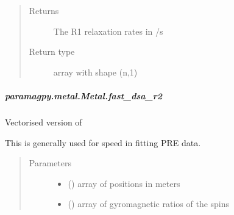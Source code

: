 \documentclass[a4paper,10pt,english]{sphinxmanual}
\begin{document}
\begin{fulllineitems}
\begin{fulllineitems}
\begin{fulllineitems}
\begin{quote}
\begin{description}
\begin{itemize}
\end{itemize}

\item[{Returns}] \leavevmode
{} \textendash{} The R1 relaxation rates in /s

\item[{Return type}] \leavevmode
array with shape (n,1)

\end{description}\end{quote}

\end{fulllineitems}



\subparagraph{paramagpy.metal.Metal.fast\_dsa\_r2}
\label{\detokenize{reference/generated/paramagpy.metal.Metal.fast_dsa_r2:paramagpy-metal-metal-fast-dsa-r2}}\label{\detokenize{reference/generated/paramagpy.metal.Metal.fast_dsa_r2::doc}}

\begin{fulllineitems}
\label{\detokenize{reference/generated/paramagpy.metal.Metal.fast_dsa_r2:paramagpy.metal.Metal.fast_dsa_r2}}
Vectorised version of {\hyperref[\detokenize{reference/generated/paramagpy.metal.Metal.dsa_r2:paramagpy.metal.Metal.dsa_r2}]{}}

This is generally used for speed in fitting PRE data.
\begin{quote}\begin{description}
\item[{Parameters}] \leavevmode\begin{itemize}
\item {} 
 (\sphinxstyleliteralemphasis{\sphinxupquote{ (}}\sphinxstyleliteralemphasis{\sphinxupquote{,}}\sphinxstyleliteralemphasis{\sphinxupquote{)}}) \textendash{} array of positions in meters

\item {} 
 (\sphinxstyleliteralemphasis{\sphinxupquote{ (}}\sphinxstyleliteralemphasis{\sphinxupquote{,}}\sphinxstyleliteralemphasis{\sphinxupquote{)}}) \textendash{} array of gyromagnetic ratios of the spins


\end{itemize}
\end{description}
\end{quote}
\end{fulllineitems}
\end{fulllineitems}
\end{fulllineitems}
\end{document}
